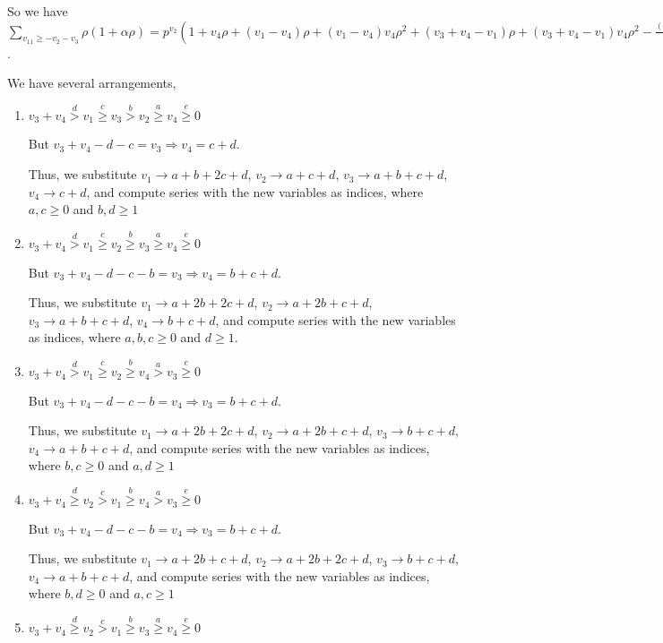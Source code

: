 \documentclass{article}
\begin{document}
So we have $\sum_{v_{11}\geq{-v_2-v_3}}\rho(1+\alpha\rho)=p^{v_2}(
1+v_4\rho+(v_1-v_4)\rho+(v_1-v_4)v_4\rho^2+
(v_3+v_4-v_1)\rho+(v_3+v_4-v_1)v_4\rho^2-\frac{(v_3+v_4-v_1+1)(v_3+v_4-v_1)}{2}\rho^2)=p^{v_2}(1+v_3\rho+v_4\rho-\frac{v_3^2}{2}\rho^2+v_1v_3\rho^2-\frac{v_4^2}{2}+v_1v_4\rho^2-\frac{v_1^2}{2}-v_3\rho^2-v_4\rho^2+v_1\rho^2)$.

We have several arrangements,
\begin{enumerate}
    \item 
$v_3+v_4\overset{d}{>}v_1\overset{c}{\geq}v_3\overset{b}{>}{v_2}\overset{a}{\geq}v_4\overset{e}{\geq}{0}$

But $v_3+v_4-d-c=v_3\Rightarrow{v_4=c+d}.$

Thus, we substitute $v_1\rightarrow{a+b+2c+d}$, $v_2\rightarrow{a+c+d}$, $v_3\rightarrow{a+b+c+d}$, $v_4\rightarrow{c+d}$, and compute series with the new variables as indices, where $a,c\geq{0}$ and $b,d\geq{1}$  
    \item 
$v_3+v_4\overset{d}{>}v_1\overset{c}{\geq}v_2\overset{b}{\geq}{v_3}\overset{a}{\geq}v_4\overset{e}{\geq}{0}$

But $v_3+v_4-d-c-b=v_3\Rightarrow{v_4=b+c+d}.$

Thus, we substitute $v_1\rightarrow{a+2b+2c+d}$, $v_2\rightarrow{a+2b+c+d}$, $v_3\rightarrow{a+b+c+d}$, $v_4\rightarrow{b+c+d}$, and compute series with the new variables as indices, where $a,b,c\geq{0}$ and $d\geq{1}$.  
    \item 
$v_3+v_4\overset{d}{>}v_1\overset{c}{\geq}v_2\overset{b}{\geq}{v_4}\overset{a}{>}v_3\overset{e}{\geq}{0}$

But $v_3+v_4-d-c-b=v_4\Rightarrow{v_3=b+c+d}.$

Thus, we substitute $v_1\rightarrow{a+2b+2c+d}$, $v_2\rightarrow{a+2b+c+d}$, $v_3\rightarrow{b+c+d}$, $v_4\rightarrow{a+b+c+d}$, and compute series with the new variables as indices, where $b,c\geq{0}$ and $a,d\geq{1}$
    \item 
$v_3+v_4\overset{d}{\geq}v_2\overset{c}{>}v_1\overset{b}{\geq}{v_4}\overset{a}{>}v_3\overset{e}{\geq}{0}$

But $v_3+v_4-d-c-b=v_4\Rightarrow{v_3=b+c+d}.$

Thus, we substitute $v_1\rightarrow{a+2b+c+d}$, $v_2\rightarrow{a+2b+2c+d}$, $v_3\rightarrow{b+c+d}$, $v_4\rightarrow{a+b+c+d}$, and compute series with the new variables as indices, where $b,d\geq{0}$ and $a,c\geq{1}$
    \item 
$v_3+v_4\overset{d}{\geq}v_2\overset{c}{>}v_1\overset{b}{\geq}{v_3}\overset{a}{\geq}v_4\overset{e}{\geq}{0}$


\end{enumerate}
\end{document}
